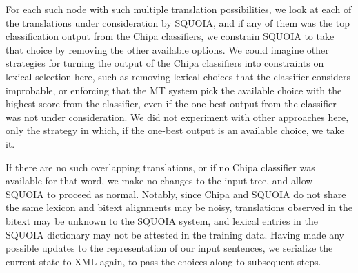 For each such node with such multiple translation possibilities, we look at
each of the translations under consideration by SQUOIA, and if any of them was
the top classification output from the Chipa classifiers, we constrain SQUOIA
to take that choice by removing the other available options. We could imagine
other strategies for turning the output of the Chipa classifiers into
constraints on lexical selection here, such as removing lexical choices that
the classifier considers improbable, or enforcing that the MT system pick the
available choice with the highest score from the classifier, even if the
one-best output from the classifier was not under consideration. We did not
experiment with other approaches here, only the strategy in which, if the
one-best output is an available choice, we take it.

If there are no such overlapping translations, or if no Chipa classifier was
available for that word, we make no changes to the input tree, and allow SQUOIA
to proceed as normal. Notably, since Chipa and SQUOIA do not share the same
lexicon and bitext alignments may be noisy, translations observed in the bitext
may be unknown to the SQUOIA system, and lexical entries in the SQUOIA
dictionary may not be attested in the training data.
Having made any possible updates to the representation of our input sentences,
we serialize the current state to XML again, to pass the choices along to
subsequent steps.


